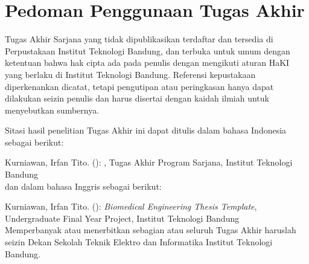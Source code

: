 \clearpage
\chapter*{Pedoman Penggunaan Tugas Akhir}

Tugas Akhir Sarjana yang tidak dipublikasikan terdaftar dan tersedia di Perpustakaan Institut Teknologi Bandung, dan terbuka untuk umum dengan ketentuan bahwa hak cipta ada pada penulis dengan mengikuti aturan HaKI yang berlaku di Institut Teknologi Bandung. Referensi kepustakaan diperkenankan dicatat, tetapi pengutipan atau peringkasan hanya dapat dilakukan seizin penulis dan harus disertai dengan kaidah ilmiah untuk menyebutkan sumbernya.

Sitasi hasil penelitian Tugas Akhir ini dapat ditulis dalam bahasa Indonesia sebagai berikut:

\hangindent=1.27cm Kurniawan, Irfan Tito. (\the\year): \textit{\thetitle}, Tugas Akhir Program Sarjana, Institut Teknologi Bandung\\

dan dalam bahasa Inggris sebagai berikut:

\hangindent=1.27cm Kurniawan, Irfan Tito. (\the\year): \textit{Biomedical Engineering Thesis Template}, Undergraduate Final Year Project, Institut Teknologi Bandung\\

Memperbanyak atau menerbitkan sebagian atau seluruh Tugas Akhir haruslah seizin Dekan Sekolah Teknik Elektro dan Informatika Institut Teknologi Bandung.

\clearpage